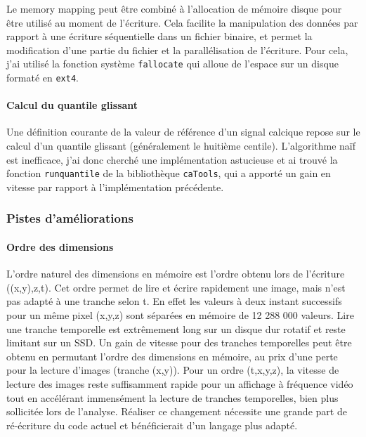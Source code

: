 Le memory mapping peut être combiné à l'allocation de mémoire disque pour être utilisé au moment de l'écriture. Cela facilite la manipulation des données par rapport à une écriture séquentielle dans un fichier binaire, et permet la modification d'une partie du fichier et la parallélisation de l'écriture. Pour cela, j'ai utilisé la fonction système \verb|fallocate| qui alloue de l'espace sur un disque formaté en \verb|ext4|.

\paragraph{Calcul du quantile glissant}
Une définition courante de la valeur de référence d'un signal calcique repose sur le calcul d'un quantile glissant (généralement le huitième centile). L'algorithme naïf est inefficace, j'ai donc cherché une implémentation astucieuse et ai trouvé la fonction \verb|runquantile| de la bibliothèque \verb|caTools|, qui a apporté un gain en vitesse par rapport à l'implémentation précédente.


\subsubsection{Pistes d'améliorations}

\paragraph{Ordre des dimensions}
L'ordre naturel des dimensions en mémoire est l'ordre obtenu lors de l'écriture ((x,y),z,t). Cet ordre permet de lire et écrire rapidement une image, mais n'est pas adapté à une tranche selon t. En effet les valeurs à deux instant successifs pour un même pixel (x,y,z) sont séparées en mémoire de 12 288 000 valeurs. Lire une tranche temporelle est extrêmement long sur un disque dur rotatif et reste limitant sur un SSD. Un gain de vitesse pour des tranches temporelles peut être obtenu en permutant l'ordre des dimensions en mémoire, au prix d'une perte pour la lecture d'images (tranche (x,y)). Pour un ordre (t,x,y,z), la vitesse de lecture des images reste suffisamment rapide pour un affichage à fréquence vidéo tout en accélérant immensément la lecture de tranches temporelles, bien plus sollicitée lors de l'analyse. Réaliser ce changement nécessite une grande part de ré-écriture du code actuel et bénéficierait d'un langage plus adapté.

